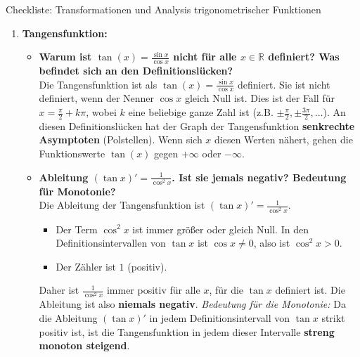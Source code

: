 \begin{loesungsumgebung}{Checkliste: Transformationen und Analysis trigonometrischer Funktionen}
\begin{enumerate}[label=(\alph*)]
    \item \textbf{Tangensfunktion:}
    \begin{itemize}
        \item \textbf{Warum ist $\tan(x) = \frac{\sin x}{\cos x}$ nicht für alle $x \in \mathbb{R}$ definiert? Was befindet sich an den Definitionslücken?} \\
        Die Tangensfunktion ist als $\tan(x) = \frac{\sin x}{\cos x}$ definiert. Sie ist nicht definiert, wenn der Nenner $\cos x$ gleich Null ist.
        Dies ist der Fall für $x = \frac{\pi}{2} + k\pi$, wobei $k$ eine beliebige ganze Zahl ist (z.B. $\pm\frac{\pi}{2}, \pm\frac{3\pi}{2}, \dots$).
        An diesen Definitionslücken hat der Graph der Tangensfunktion \textbf{senkrechte Asymptoten} (Polstellen). Wenn sich $x$ diesen Werten nähert, gehen die Funktionswerte $\tan(x)$ gegen $+\infty$ oder $-\infty$.

        \item \textbf{Ableitung $(\tan x)' = \frac{1}{\cos^2 x}$. Ist sie jemals negativ? Bedeutung für Monotonie?} \\
        Die Ableitung der Tangensfunktion ist $(\tan x)' = \frac{1}{\cos^2 x}$.
        \begin{itemize}
            \item Der Term $\cos^2 x$ ist immer größer oder gleich Null. In den Definitionsintervallen von $\tan x$ ist $\cos x \neq 0$, also ist $\cos^2 x > 0$.
            \item Der Zähler ist $1$ (positiv).
        \end{itemize}
        Daher ist $\frac{1}{\cos^2 x}$ immer positiv für alle $x$, für die $\tan x$ definiert ist. Die Ableitung ist also \textbf{niemals negativ}.
        \textit{Bedeutung für die Monotonie:} Da die Ableitung $(\tan x)'$ in jedem Definitionsintervall von $\tan x$ strikt positiv ist, ist die Tangensfunktion in jedem dieser Intervalle \textbf{streng monoton steigend}.
    \end{itemize}
\end{enumerate}

\end{loesungsumgebung}